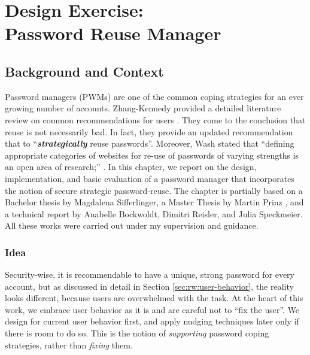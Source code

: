 \chapter[Design Exercise: Password Reuse Manager]{Design Exercise: \\Password Reuse Manager}\label{chap:pwrm}

\section{Background and Context}
Password managers (PWMs) are one of the common coping strategies for an ever growing number of accounts. 
Zhang-Kennedy \etal provided a detailed literature review on common recommendations for users \cite{ZhangKennedy2016RevisitingPasswordRules}. They come to the conclusion that reuse is not necessarily bad. In fact, they provide an updated recommendation that to ``\textit{\textbf{strategically}} reuse passwords''. Moreover, Wash \etal stated that ``defining appropriate categories of websites for re-use of passwords of varying strengths is an open area of research;'' \cite{Wash2016UnderstandingPasswordChoices}. In this chapter, we report on the design, implementation, and basic evaluation of a password manager that incorporates the notion of secure strategic password-reuse. The chapter is partially based on a Bachelor thesis by Magdalena Sifferlinger, a Master Thesis by Martin Prinz \cite{Prinz2017Thesis}, and a technical report by Anabelle Bockwoldt, Dimitri Reisler, and Julia Speckmeier. All these works were carried out under my supervision and guidance. \ar

\subsection{Idea}
Security-wise, it is recommendable to have a unique, strong password for every account, but as discussed in detail in Section \ref{sec:rw:user-behavior}, the reality looks different, because users are overwhelmed with the task. At the heart of this work, we embrace user behavior as it is and are careful not to ``fix the user''. We design for current user behavior first, and apply nudging techniques later only if there is room to do so. This is the notion of \textit{supporting} password coping strategies, rather than \textit{fixing} them. 

